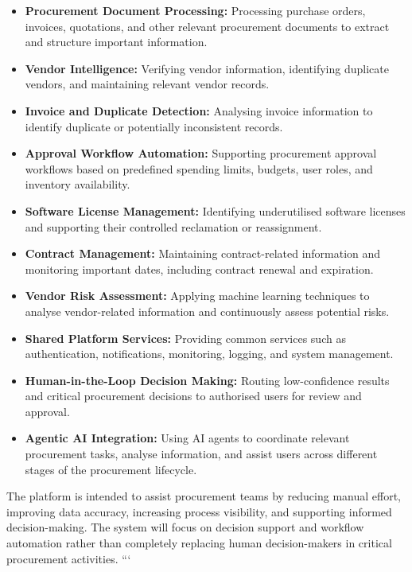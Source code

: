 \begin{itemize}
    \item \textbf{Procurement Document Processing:} Processing purchase orders, invoices, quotations, and other relevant procurement documents to extract and structure important information.

    \item \textbf{Vendor Intelligence:} Verifying vendor information, identifying duplicate vendors, and maintaining relevant vendor records.

    \item \textbf{Invoice and Duplicate Detection:} Analysing invoice information to identify duplicate or potentially inconsistent records.

    \item \textbf{Approval Workflow Automation:} Supporting procurement approval workflows based on predefined spending limits, budgets, user roles, and inventory availability.

    \item \textbf{Software License Management:} Identifying underutilised software licenses and supporting their controlled reclamation or reassignment.

    \item \textbf{Contract Management:} Maintaining contract-related information and monitoring important dates, including contract renewal and expiration.

    \item \textbf{Vendor Risk Assessment:} Applying machine learning techniques to analyse vendor-related information and continuously assess potential risks.

    \item \textbf{Shared Platform Services:} Providing common services such as authentication, notifications, monitoring, logging, and system management.

    \item \textbf{Human-in-the-Loop Decision Making:} Routing low-confidence results and critical procurement decisions to authorised users for review and approval.

    \item \textbf{Agentic AI Integration:} Using AI agents to coordinate relevant procurement tasks, analyse information, and assist users across different stages of the procurement lifecycle.
\end{itemize}

The platform is intended to assist procurement teams by reducing manual effort, improving data accuracy, increasing process visibility, and supporting informed decision-making. The system will focus on decision support and workflow automation rather than completely replacing human decision-makers in critical procurement activities.
```

